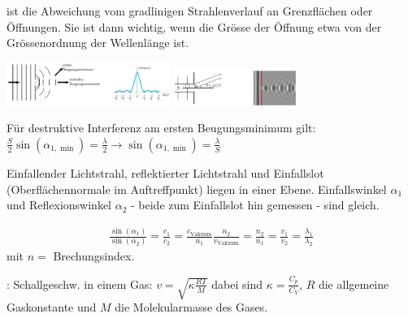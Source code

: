 \vspace{1\baselineskip}

 ist die Abweichung vom gradlinigen Strahlenverlauf an Grenzflächen oder
Öffnungen. Sie ist dann wichtig, wenn die Grösse der Öffnung etwa von der Grössenordnung
der Wellenlänge ist.
\begin{center}
    \includegraphics[width=0.4\textwidth]{Figures/Beugung2.png}
    \includegraphics[width=0.3\textwidth]{Figures/Beugung3.png}
\end{center}
Für destruktive Interferenz am ersten Beugungsminimum gilt:
$\frac{S}{2} \sin (\alpha_{1,\min}) = \frac{\lambda}{2} \longrightarrow
\sin (\alpha_{1,\min}) = \frac{\lambda}{S}$

\vspace{1\baselineskip}

Einfallender Lichtstrahl, reflektierter Lichtstrahl und Einfallslot (Oberflächennormale
im Auftreffpunkt) liegen in einer Ebene. Einfallswinkel $\alpha_1$ und Reflexionswinkel
$\alpha_2$ - beide zum Einfallslot hin gemessen - sind gleich.

\vspace{1\baselineskip}

\begin{align*}
    \frac{\sin(\alpha_1)}{\sin(\alpha_2)} = \frac{c_1}{c_2} =
    \frac{c_{\text{Vakuum}}}{n_1} \frac{n_2}{v_{\text{Vakuum}}}
    = \frac{n_2}{n_1}
    = \frac{v_1}{v_2}
    = \frac{\lambda_1}{\lambda_2}
\end{align*}
mit $n=$ Brechungsindex.

\vspace{1\baselineskip}

:
Schallgeschw. in einem Gas: $v = \sqrt{\kappa \frac{R T}{M}}$ dabei sind
$\kappa = \frac{C_p}{C_V}$, $R$ die allgemeine Gaskonstante und $M$ die Molekularmasse
des Gases.

\vspace{1\baselineskip}

